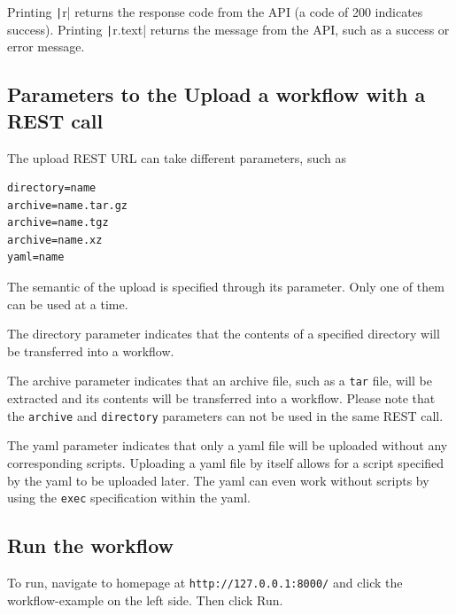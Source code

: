 Printing \texttt|r| returns the response code from the API (a code of
200 indicates success). Printing \texttt|r.text| returns the message
from the API, such as a success or error message.

\subsection{Parameters to the Upload a workflow with a REST
call}\label{parameters-to-the-upload-a-workflow-with-a-rest-call}

The upload REST URL can take different parameters, such as

\begin{verbatim}
directory=name
archive=name.tar.gz
archive=name.tgz
archive=name.xz
yaml=name
\end{verbatim}

The semantic of the upload is specified through its parameter. Only one
of them can be used at a time.

The directory parameter indicates that the contents of a specified
directory will be transferred into a workflow.

The archive parameter indicates that an archive file, such as a
\texttt{tar} file, will be extracted and its contents will be
transferred into a workflow. Please note that the \texttt{archive} and
\texttt{directory} parameters can not be used in the same REST call.

The yaml parameter indicates that only a yaml file will be uploaded
without any corresponding scripts. Uploading a yaml file by itself
allows for a script specified by the yaml to be uploaded later. The yaml
can even work without scripts by using the \texttt{exec} specification
within the yaml.

\subsection{Run the workflow}\label{run-the-workflow}

To run, navigate to homepage at \texttt{http://127.0.0.1:8000/} and
click the workflow-example on the left side. Then click Run.
